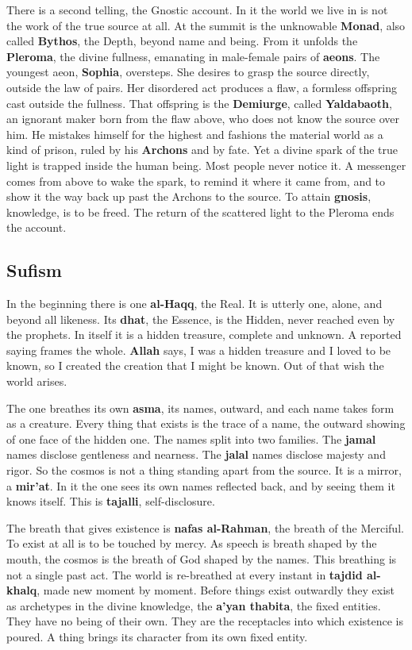 There is a second telling, the Gnostic account. In it the world we live in is not the work of the true source at all. At the summit is the unknowable \textbf{Monad}, also called \textbf{Bythos}, the Depth, beyond name and being. From it unfolds the \textbf{Pleroma}, the divine fullness, emanating in male-female pairs of \textbf{aeons}. The youngest aeon, \textbf{Sophia}, oversteps. She desires to grasp the source directly, outside the law of pairs. Her disordered act produces a flaw, a formless offspring cast outside the fullness. That offspring is the \textbf{Demiurge}, called \textbf{Yaldabaoth}, an ignorant maker born from the flaw above, who does not know the source over him. He mistakes himself for the highest and fashions the material world as a kind of prison, ruled by his \textbf{Archons} and by fate. Yet a divine spark of the true light is trapped inside the human being. Most people never notice it. A messenger comes from above to wake the spark, to remind it where it came from, and to show it the way back up past the Archons to the source. To attain \textbf{gnosis}, knowledge, is to be freed. The return of the scattered light to the Pleroma ends the account.

\subsection{Sufism}

In the beginning there is one \textbf{al-Haqq}, the Real. It is utterly one, alone, and beyond all likeness. Its \textbf{dhat}, the Essence, is the Hidden, never reached even by the prophets. In itself it is a hidden treasure, complete and unknown. A reported saying frames the whole. \textbf{Allah} says, I was a hidden treasure and I loved to be known, so I created the creation that I might be known. Out of that wish the world arises.

The one breathes its own \textbf{asma}, its names, outward, and each name takes form as a creature. Every thing that exists is the trace of a name, the outward showing of one face of the hidden one. The names split into two families. The \textbf{jamal} names disclose gentleness and nearness. The \textbf{jalal} names disclose majesty and rigor. So the cosmos is not a thing standing apart from the source. It is a mirror, a \textbf{mir'at}. In it the one sees its own names reflected back, and by seeing them it knows itself. This is \textbf{tajalli}, self-disclosure.

The breath that gives existence is \textbf{nafas al-Rahman}, the breath of the Merciful. To exist at all is to be touched by mercy. As speech is breath shaped by the mouth, the cosmos is the breath of God shaped by the names. This breathing is not a single past act. The world is re-breathed at every instant in \textbf{tajdid al-khalq}, made new moment by moment. Before things exist outwardly they exist as archetypes in the divine knowledge, the \textbf{a'yan thabita}, the fixed entities. They have no being of their own. They are the receptacles into which existence is poured. A thing brings its character from its own fixed entity.

